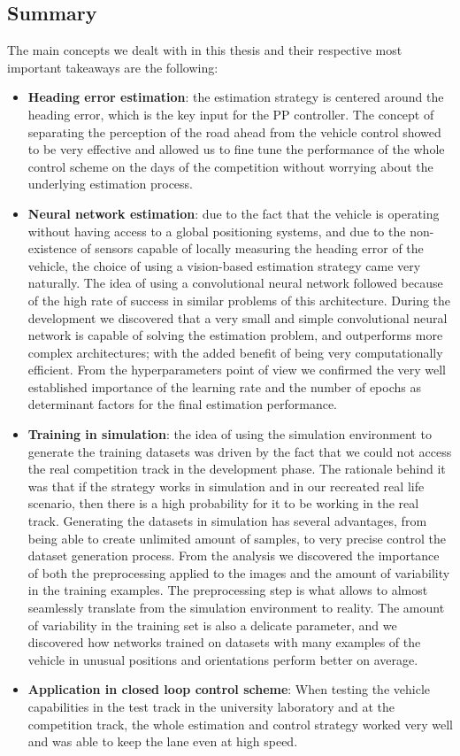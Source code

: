 \documentclass[a4paper,12pt,sort&compress]{article}
\begin{document}
\subsection{Summary}
The main concepts we dealt with in this thesis and their respective most important takeaways are the following:
\begin{itemize}
    \item \textbf{Heading error estimation}: the estimation strategy is centered around the heading
    error, which is the key input for the PP controller. The concept of separating the perception of
    the road ahead from the vehicle control showed to be very effective and allowed us to fine tune
    the performance of the whole control scheme on the days of the competition without worrying
    about the underlying estimation process.  
    \item \textbf{Neural network estimation}: due to the fact that the vehicle is operating without
    having access to a global positioning systems, and due to the non-existence of sensors capable
    of locally measuring the heading error of the vehicle, the choice of using a vision-based
    estimation strategy came very naturally. The idea of using a convolutional neural network followed
    because of the high rate of success in similar problems of this architecture. During the
    development we discovered that a very small and simple convolutional neural network is capable
    of solving the estimation problem, and outperforms more complex architectures; with the added
    benefit of being very computationally efficient. From the hyperparameters point of view we
    confirmed the very well established importance of the learning rate and the number of epochs as
    determinant factors for the final estimation performance.
    \item \textbf{Training in simulation}: the idea of using the simulation environment to
    generate the training datasets was driven by the fact that we could not access the real
    competition track in the development phase. The rationale behind it was that if the strategy
    works in simulation and in our recreated real life scenario, then there is a high probability
    for it to be working in the real track. Generating the datasets in simulation has several
    advantages, from being able to create unlimited amount of samples, to very precise control the
    dataset generation process.  From the analysis we discovered the importance of both the
    preprocessing applied to the images and the amount of variability in the training examples. The
    preprocessing step is what allows to almost seamlessly translate from the simulation environment to
    reality. The amount of variability in the training set is also a delicate parameter, and we
    discovered how networks trained on datasets with many examples of the vehicle in unusual
    positions and orientations perform better on average.
    \item \textbf{Application in closed loop control scheme}: When testing the vehicle capabilities
    in the test track in the university laboratory and at the competition track, the whole
    estimation and control strategy worked very well and was able to keep the lane even at high speed.
\end{itemize}
\end{document}
